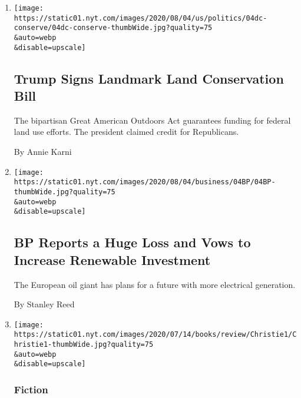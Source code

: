 \begin{enumerate}
\def\labelenumi{\arabic{enumi}.}
\item
  \href{/2020/08/04/us/politics/trump-land-conservation-bill.html}{}

  \texttt{[image: https://static01.nyt.com/images/2020/08/04/us/politics/04dc-conserve/04dc-conserve-thumbWide.jpg?quality=75\\\&auto=webp\\\&disable=upscale]}

  \hypertarget{trump-signs-landmark-land-conservation-bill}{%
  \subsection{Trump Signs Landmark Land Conservation
  Bill}\label{trump-signs-landmark-land-conservation-bill}}

  The bipartisan Great American Outdoors Act guarantees funding for
  federal land use efforts. The president claimed credit for
  Republicans.

  By Annie Karni
\item
  \href{/2020/08/04/business/energy-environment/bp-renewable-investment.html}{}

  \texttt{[image: https://static01.nyt.com/images/2020/08/04/business/04BP/04BP-thumbWide.jpg?quality=75\\\&auto=webp\\\&disable=upscale]}

  \hypertarget{bp-reports-a-huge-loss-and-vows-to-increase-renewable-investment}{%
  \subsection{BP Reports a Huge Loss and Vows to Increase Renewable
  Investment}\label{bp-reports-a-huge-loss-and-vows-to-increase-renewable-investment}}

  The European oil giant has plans for a future with more electrical
  generation.

  By Stanley Reed
\item
  \href{/2020/08/04/books/review/migrations-charlotte-mcconaghy.html}{}

  \texttt{[image: https://static01.nyt.com/images/2020/07/14/books/review/Christie1/Christie1-thumbWide.jpg?quality=75\\\&auto=webp\\\&disable=upscale]}

  \hypertarget{fiction}{%
  \subsubsection{Fiction}\label{fiction}}

  \hypertarget{the-animals-are-dying-soon-we-will-be-alone-here}{%
}
\end{enumerate}
